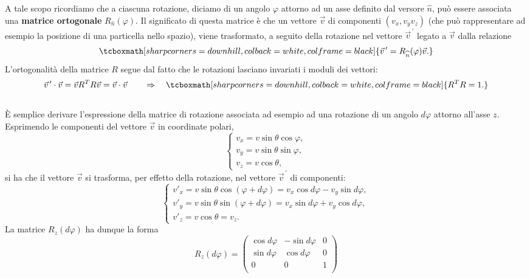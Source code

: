 A tale scopo ricordiamo che a ciascuna rotazione, diciamo di un angolo $\varphi$ attorno ad un asse definito dal versore $\widehat{n}$, può essere associata una \textbf{matrice ortogonale} $R_{\widehat{n}} (\varphi)$. Il significato di questa matrice è che un vettore $\vec{v}$ di componenti $(v_x, v_y v_z) $ (che può rappresentare ad esempio la posizione di una particella nello spazio), viene trasformato, a seguito della rotazione nel vettore $\vec{v}^{\, \prime}$ legato a $\vec{v}$ dalla relazione
	\begin{equation}
		\tcboxmath[sharp corners=downhill, colback=white, colframe=black]{
			\vec{v}^{\, \prime}= R_{\widehat{n}} (\varphi)\vec{v}.
			}
	\end{equation}
L'ortogonalità della matrice $R$ segue dal fatto che le rotazioni lasciano invariati i moduli dei vettori:
	\begin{equation}
		\vec{v}^{\, \prime}\cdot\vec{v} = \vec{v}R^T R \vec{v}= \vec{v}\cdot\vec{v} \qquad \Rightarrow \quad
		\tcboxmath[sharp corners=downhill, colback=white, colframe=black]{
 		R^T R =1.
 		}
	\end{equation}\\
	
È semplice derivare l'espressione della matrice di rotazione associata ad esempio ad una rotazione di un angolo $d\varphi $ attorno all'asse $z$. Esprimendo le componenti del vettore $\vec{v}$ in coordinate polari,
	\begin{equation}
		\begin{cases}
			v_x = v \sin\theta \cos \varphi ,\\
			v_y = v \sin\theta \sin \varphi ,\\
			v_z = v \cos\theta ,
		\end{cases}
	\end{equation}
si ha che il vettore $\vec{v}$ si trasforma, per effetto della rotazione, nel vettore $\vec{v}^{\, \prime}$ di componenti:
	\begin{equation}
		\begin{cases}
			v'_x = v \sin\theta \cos (\varphi +d\varphi )= v_x \cos d\varphi - v_y \sin d\varphi ,\\
			v'_y = v \sin\theta \sin (\varphi +d\varphi ) = v_x \sin d\varphi + v_y \cos d\varphi ,\\
			v'_z = v \cos\theta = v_z .
	\end{cases}
	\end{equation}
La matrice $R_z (d\varphi)$ ha dunque la forma
	\begin{equation}
		R_z (d\varphi)=
		\begin{pmatrix}
			\cos d\varphi & -\sin d\varphi & 0\\
			\sin d\varphi & \cos d\varphi & 0 \\
			0 & 0 & 1 \\
		\end{pmatrix}
	\end{equation}\\
	
